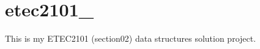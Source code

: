 \chapter{etec2101\+\_}
\hypertarget{index}{}\label{index}
\label{index_md__r_e_a_d_m_e}%
%
This is my ETEC2101 (section02) data structures solution project. 